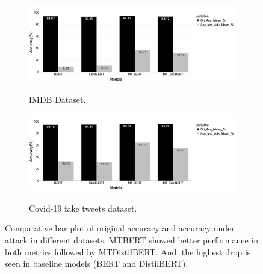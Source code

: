 \documentclass[%
	BCOR=8mm, %
	DIV=12,
	toc=bibliography, %
	toc=listof, %
	oneside, %
	egregdoesnotlikesansseriftitles, %
	]{scrbook}
\begin{document}

\begin{figure}[H]
    \centering
    \begin{subfigure}
            \centering
            \includegraphics[width=.85\linewidth]{img/MOAandAUA_Imdb.png}
            \caption{IMDB Dataset.}{}
               \label{fig:}
        \end{subfigure}
    \begin{subfigure}
            \centering
            \includegraphics[width=.85\linewidth]{img/MOAandAUA_fknews}
            \caption{Covid-19 fake tweets dataset.}{}
              \label{fig:sub2}
        \end{subfigure}
 \caption[Comparative bar plot between original accuracy and accuracy under attack]{\small Comparative bar plot of original accuracy and accuracy under attack in different datasets. MTBERT showed better performance in both metrics followed by MTDistilBERT. And, the highest drop is seen in baseline models (BERT and DistilBERT).}
  \label{fig:moaandauaimdb}
\end{figure}
\end{document}
